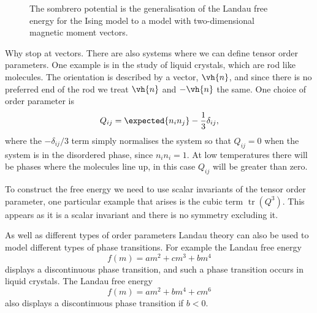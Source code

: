 \documentclass[fleqn]{NotesClass}
\DeclareMathOperator{\tr}{tr}
\begin{document}
    \begin{figure}
        \caption[Sombrero potential.]{The sombrero potential is the generalisation of the Landau free energy for the Ising model to a model with two-dimensional magnetic moment vectors.}
        \label{fig:sombrero potential}
    \end{figure}
    
    Why stop at vectors.
    There are also systems where we can define tensor order parameters.
    One example is in the study of liquid crystals, which are rod like molecules.
    The orientation is described by a vector, \(\vh{n}\), and since there is no preferred end of the rod we treat \(\vh{n}\) and \(-\vh{n}\) the same.
    One choice of order parameter is
    \begin{equation}
        Q_{ij} = \expected{n_in_j} - \frac{1}{3}\delta_{ij},
    \end{equation}
    where the \(-\delta_{ij}/3\) term simply normalises the system so that \(Q_{ij} = 0\) when the system is in the disordered phase, since \(n_in_i = 1\).
    At low temperatures there will be phases where the molecules line up, in this case \(Q_{ij}\) will be greater than zero.
    
    To construct the free energy we need to use scalar invariants of the tensor order parameter, one particular example that arises is the cubic term \(\tr(Q^3)\).
    This appears as it is a scalar invariant and there is no symmetry excluding it.
    
    As well as different types of order parameters Landau theory can also be used to model different types of phase transitions.
    For example the Landau free energy
    \begin{equation}
        f(m) = am^2 + cm^3 + bm^4
    \end{equation}
    displays a discontinuous phase transition, and such a phase transition occurs in liquid crystals.
    The Landau free energy
    \begin{equation}
        f(m) = am^2 + bm^4 + cm^6
    \end{equation}
    also displays a discontinuous phase transition if \(b < 0\).
    
\end{document}
